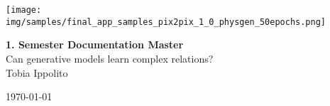 \documentclass[fontsize=11pt, paper=a4, pagesize=auto]{scrreprt}
\begin{document}
\begin{titlepage}
	\centering
	\vspace*{0cm}
	
	\texttt{[image: img/samples/final\_app\_samples\_pix2pix\_1\_0\_physgen\_50epochs.png]}
	
	\vspace{2cm}
	{\Huge \textbf{1. Semester Documentation Master}}\\[0.5cm]
	{\Large Can generative models learn complex relations?}\\[2cm]
	
	{\large Tobia Ippolito}
	
	\vfill
	{\large \today}
\end{titlepage}
\tableofcontents



\cleardoublepage
{}







{}
\begin{flushleft}
	\printbibliography[heading=bibintoc]
\end{flushleft}

%
\end{document}
